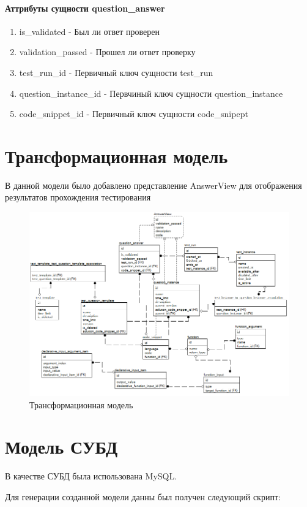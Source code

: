 \documentclass{article}
\begin{document}
\paragraph{Аттрибуты сущности question\_answer}
\begin{enumerate}
	\item is\_validated - Был ли ответ проверен
	\item validation\_passed - Прошел ли ответ проверку
	\item test\_run\_id - Первичный ключ сущности test\_run
	\item question\_instance\_id - Первчиный ключ сущности question\_instance 
	\item code\_snippet\_id - Первичный ключ сущности code\_snipept
\end{enumerate}


\section{Трансформационная модель}
В данной модели было добавлено представление AnswerView
для отображения результатов прохождения тестирования
\begin{figure}[H]
	\includegraphics[width=\textwidth, center]{transformed_model.png}
	\caption{Трансформационная модель}
\end{figure}


\section{Модель СУБД}
В качестве СУБД была использована MySQL.

Для генерации созданной модели данны был получен
следующий скрипт:
\end{document}

